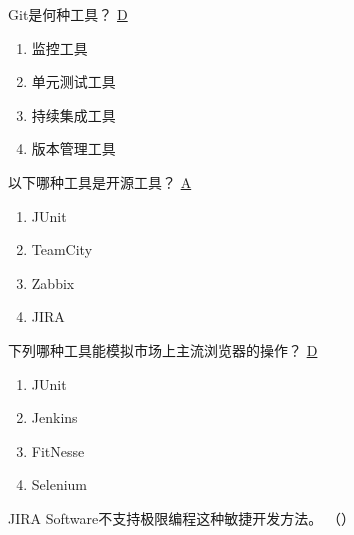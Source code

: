 \begin{problem}
	Git是何种工具？
	\uline{D}    
    \vspace{-0.8em}
    \begin{multicols}{4}
        \begin{enumerate}[label=\Alph*.]
            \item 监控工具
            \item 单元测试工具
            \item 持续集成工具
            \item 版本管理工具
        \end{enumerate}
    \end{multicols}
    \vspace{-1em}
\end{problem}


\begin{problem}
	以下哪种工具是开源工具？
	\uline{A}    
    \vspace{-0.8em}
    \begin{multicols}{4}
        \begin{enumerate}[label=\Alph*.]
            \item JUnit
            \item TeamCity
            \item Zabbix
            \item JIRA
        \end{enumerate}
    \end{multicols}
    \vspace{-1em}
\end{problem}


\begin{problem}
	下列哪种工具能模拟市场上主流浏览器的操作？
	\uline{D}    
    \vspace{-0.8em}
    \begin{multicols}{4}
        \begin{enumerate}[label=\Alph*.]
            \item JUnit
            \item Jenkins
            \item FitNesse
            \item Selenium
        \end{enumerate}
    \end{multicols}
    \vspace{-1em}
\end{problem}


\begin{problem}
	JIRA Software不支持极限编程这种敏捷开发方法。
    \hfill （）
\end{problem}


